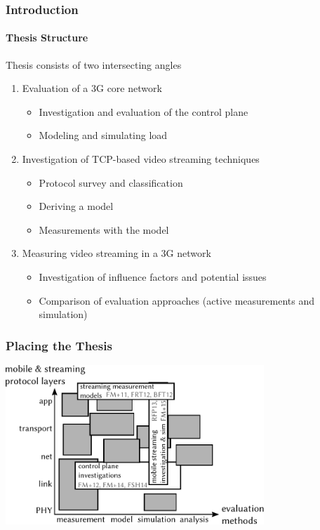 \documentclass{beamer}
\begin{document}
\begin{frame}
	\frametitle{Introduction}
	\framesubtitle{Thesis Structure}

	Thesis consists of two intersecting angles
	\begin{enumerate}
		\item Evaluation of a 3G core network
			\begin{itemize}
				\item Investigation and evaluation of the control plane
				\item Modeling and simulating load
			\end{itemize}

		\item<2-> Investigation of TCP-based video streaming techniques
			\begin{itemize}[<2->]
				\item Protocol survey and classification
				\item Deriving a model
				\item Measurements with the model
			\end{itemize}

		\item<3-> Measuring video streaming in a 3G network 
			\begin{itemize}[<3->]
				\item Investigation of influence factors and potential issues
				\item Comparison of evaluation approaches (active measurements and simulation)
			\end{itemize}
	\end{enumerate}


\end{frame}

\begin{frame}
	\frametitle{Placing the Thesis}

	\begin{center}
		\includegraphics[height=6cm]{extras/placement.pdf}
	\end{center}

\end{frame}
\end{document}
